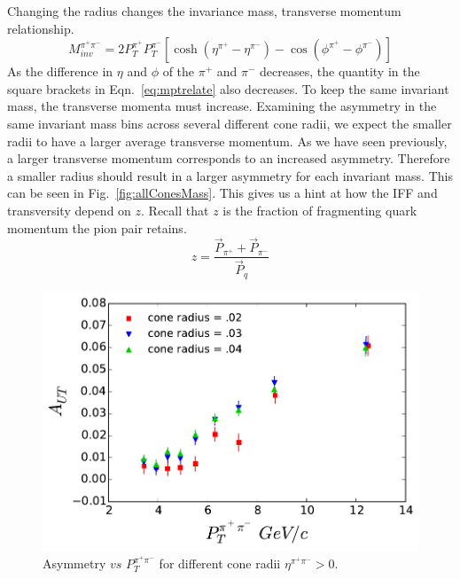 \documentclass[letterpaper, abstract = on,listof=totoc, bibliography=totoc]{scrreprt}
\newcommand{\ptpair}{P_{T}^{\pi^+\pi^-}}
\newcommand{\mpair}{M_{inv}^{\pi^+\pi^-}}
\newcommand{\etapair}{\eta^{\pi^+\pi^-}}
\newcommand{\pip}{\pi^+}
\newcommand{\pim}{\pi^-}
\begin{document}
Changing the radius changes the invariance mass, transverse momentum relationship. 
\begin{equation}
\label{eq:mptrelate}
\mpair = 2P_T^{\pi^+}P_T^{\pi^-}\left[\cosh \left(\eta^{\pi^+}-\eta^{\pi^-}\right) - \cos \left(\phi^{\pi^+}-\phi^{\pi^-}\right)\right]
\end{equation}
%
As the difference in $\eta$ and $\phi$ of the $\pip$ and $\pim$ decreases, the quantity in the square brackets in Eqn.~\ref{eq:mptrelate} also decreases. To keep the same invariant mass, the transverse momenta must increase. Examining the asymmetry in the same invariant mass bins across several different cone radii, we expect the smaller radii to have a larger average transverse momentum. As we have seen previously, a larger transverse momentum corresponds to an increased asymmetry. Therefore a smaller radius should result in a larger asymmetry for each invariant mass. This can be seen in Fig.~\ref{fig:allConesMass}. This gives us a hint at how the IFF and transversity depend on $z$. Recall that $z$ is the fraction of fragmenting quark momentum the pion pair retains.
\begin{equation}
\label{eq:mptrelate}
z = \frac{\vec{P}_{\pip} + \vec{P}_{\pim}}{\vec{P}_q}
\end{equation}
%

\begin{figure}
\begin{center}
\includegraphics[width = .8\textwidth]{allConeAsymsVs_Pt_8_24_15_HiEta}
\caption[Asymmetry $vs$ $\ptpair$ for different cone radii.]{Asymmetry $vs$ $\ptpair$ for different cone radii $\etapair > 0$.}
\label{fig:allConesPt}
\end{center}
\end{figure}
\end{document}
